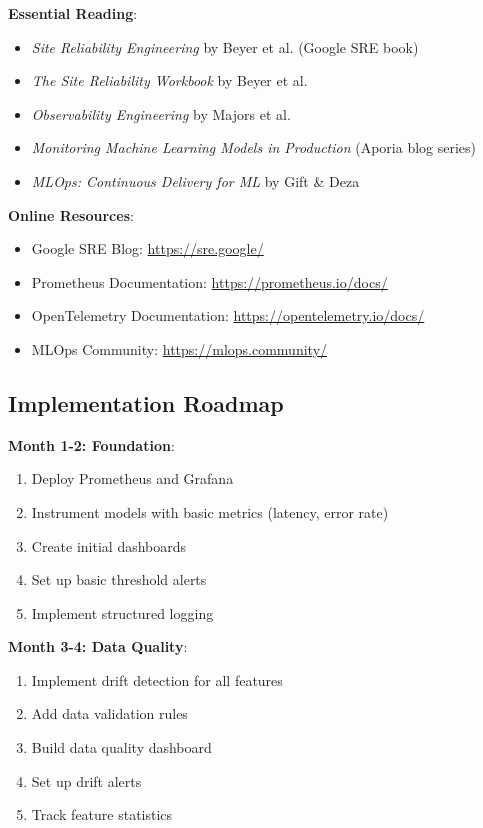 \textbf{Essential Reading}:
\begin{itemize}
    \item \textit{Site Reliability Engineering} by Beyer et al. (Google SRE book)
    \item \textit{The Site Reliability Workbook} by Beyer et al.
    \item \textit{Observability Engineering} by Majors et al.
    \item \textit{Monitoring Machine Learning Models in Production} (Aporia blog series)
    \item \textit{MLOps: Continuous Delivery for ML} by Gift \& Deza
\end{itemize}

\textbf{Online Resources}:
\begin{itemize}
    \item Google SRE Blog: \url{https://sre.google/}
    \item Prometheus Documentation: \url{https://prometheus.io/docs/}
    \item OpenTelemetry Documentation: \url{https://opentelemetry.io/docs/}
    \item MLOps Community: \url{https://mlops.community/}
\end{itemize}

\subsection{Implementation Roadmap}

\textbf{Month 1-2: Foundation}:
\begin{enumerate}
    \item Deploy Prometheus and Grafana
    \item Instrument models with basic metrics (latency, error rate)
    \item Create initial dashboards
    \item Set up basic threshold alerts
    \item Implement structured logging
\end{enumerate}

\textbf{Month 3-4: Data Quality}:
\begin{enumerate}
    \item Implement drift detection for all features
    \item Add data validation rules
    \item Build data quality dashboard
    \item Set up drift alerts
    \item Track feature statistics
\end{enumerate}

